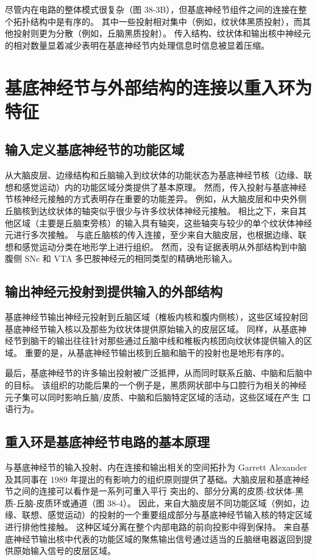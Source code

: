 尽管内在电路的整体模式很复杂（图 38-3B），但基底神经节组件之间的连接在整个拓扑结构中是有序的。 其中一些投射相对集中（例如，纹状体黑质投射），而其他投射则更为分散（例如，丘脑黑质投射）。 传入结构、纹状体和输出核中神经元的相对数量显着减少表明在基底神经节内处理信息时信息被显着压缩。


\section{基底神经节与外部结构的连接以重入环为特征}
\subsection{输入定义基底神经节的功能区域}
从大脑皮层、边缘结构和丘脑输入到纹状体的功能状态为基底神经节核（边缘、联想和感觉运动）内的功能区域分类提供了基本原理。 然而，传入投射与基底神经节核神经元接触的方式表明存在重要的功能差异。 例如，从大脑皮层和中央外侧丘脑核到达纹状体的轴突似乎很少与许多纹状体神经元接触。 相比之下，来自其他区域（主要是丘脑束旁核）的输入具有轴突，这些轴突与较少的单个纹状体神经元进行多次接触。 与底丘脑核的传入连接，至少来自大脑皮层，也根据边缘、联想和感觉运动分类在地形学上进行组织。 然而，没有证据表明从外部结构到中脑腹侧 SNc 和 VTA 多巴胺神经元的相同类型的精确地形输入。

\subsection{输出神经元投射到提供输入的外部结构}
基底神经节输出神经元投射到丘脑区域（椎板内核和腹内侧核），这些区域投射回基底神经节输入核以及那些为纹状体提供原始输入的皮层区域。 同样，从基底神经节到脑干的输出往往针对那些通过丘脑中线和椎板内核团向纹状体提供输入的区域。 重要的是，从基底神经节输出核到丘脑和脑干的投射也是地形有序的。

最后，基底神经节的许多输出投射被广泛抵押，从而同时联系丘脑、中脑和后脑中的目标。 该组织的功能后果的一个例子是，黑质网状部中与口腔行为相关的神经元子集可以同时影响丘脑/皮质、中脑和后脑特定区域的活动，这些区域在产生 口语行为。

\subsection{重入环是基底神经节电路的基本原理}
与基底神经节的输入投射、内在连接和输出相关的空间拓扑为 Garrett Alexander 及其同事在 1989 年提出的有影响力的组织原则提供了基础。大脑皮层和基底神经节之间的连接可以看作是一系列可重入平行 突出的、部分分离的皮质-纹状体-黑质-丘脑-皮质环或通道（图 38-4）。 因此，来自大脑皮层不同功能区域（例如，边缘、联想、感觉运动）的投射的一个重要组成部分与基底神经节输入核的特定区域进行排他性接触。 这种区域分离在整个内部电路的前向投影中得到保持。 来自基底神经节输出核中代表的功能区域的聚焦输出信号通过适当的丘脑继电器返回到提供原始输入信号的皮层区域。

